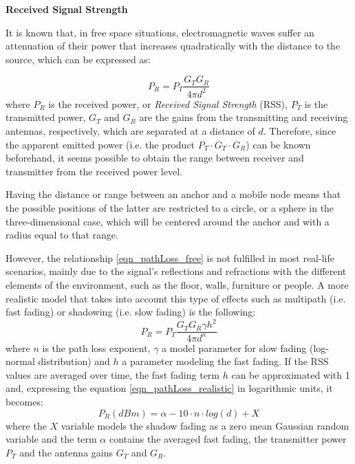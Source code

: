 \begin{description}
	\item \textbf{Received Signal Strength}
	
	It is known that, in free space situations, electromagnetic waves suffer an attenuation of their power that increases quadratically with the distance to the source, which can be expressed as:
	
	\begin{equation}
	\label{eqn_pathLoss_free}
		P_R=P_T \frac{G_T G_R}{4\pi d^2}
	\end{equation}		
	where $P_R$ is the received power, or \emph{Received Signal Strength} (RSS), $P_T$ is the transmitted power, $G_T$ and $G_R$ are the gains from the transmitting and receiving antennas, respectively, which are separated at a distance of $d$.
	Therefore, since the apparent emitted power (i.e. the product $P_T \cdot G_T \cdot G_R$) can be known beforehand, it seems possible to obtain the range between receiver and transmitter from the received power level. 
	
	Having the distance or range between an anchor and a mobile node means that the possible positions of the latter are restricted to a circle, or a sphere in the three-dimensional case, which will be centered around the anchor and with a radius equal to that range.
	
	However, the relationship \ref{eqn_pathLoss_free} is not fulfilled in most real-life scenarios, mainly due to the signal's reflections and refractions with the different elements of the environment, such as the floor, walls, furniture or people. A more realistic model that takes into account this type of effects such as multipath (i.e. fast fading) or shadowing (i.e. slow fading) is the following:
	\begin{equation}
	\label{eqn_pathLoss_realistic}
		P_R=P_T \frac{G_T G_R \gamma h^2}{4\pi d^n}
	\end{equation}	
	where $n$ is the path loss exponent, $\gamma$ a model parameter for slow fading (log-normal distribution) and $h$ a parameter modeling the fast fading.
	If the RSS values are averaged over time, the fast fading term $h$ can be approximated with 1 and, expressing the equation \ref{eqn_pathLoss_realistic} in logarithmic units, it becomes:
	\begin{equation}
	\label{eqn_pathLoss_realistic_dbm}
		P_R(dBm)=\alpha-10 \cdot n \cdot log(d) + X
	\end{equation}		
	where the $X$ variable models the shadow fading as a zero mean Gaussian random variable and the term $\alpha$ contains the averaged fast fading, the transmitter power $P_T$ and the antenna gains $G_T$ and $G_R$.
		

\end{description}
